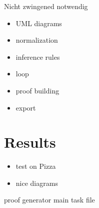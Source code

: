 \documentclass[titlepage]{article}
\begin{document}
Nicht zwingened notwendig
\begin{itemize}
  \item UML diagrams
  \item normalization
  \item inference rules
  \item loop
  \item proof building
  \item export
\end{itemize}
\section{Results}
\begin{itemize}
  \item test on Pizza
  \item nice diagrams
\end{itemize}

proof generator main task file 

\printbibliography
\end{document}
